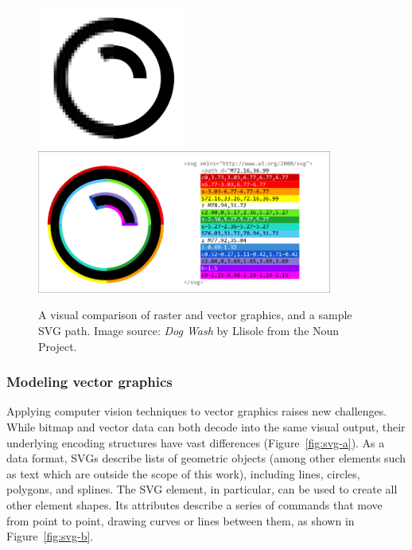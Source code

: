 \begin{figure}[t]
    {\includegraphics[height=1.85in]{figures/b_vs_vec}} \quad
    {\includegraphics[height=1.85in]{figures/svgs}}
    \caption[An overview of vector graphics and Scalable Vector Graphics (SVG)]
    {A visual comparison of raster and vector graphics, and a sample SVG path.
    Image source: \textit{Dog Wash} by Llisole from the Noun Project.\label{fig:svg}}
\end{figure}

\subsubsection{Modeling vector graphics}
Applying computer vision techniques to vector graphics raises new challenges.
While bitmap and vector data can both decode into the same visual output, their underlying encoding structures have vast differences (Figure~\ref{fig:svg-a}).
As a data format, SVGs describe lists of geometric objects (among other elements such as text which are outside the scope of this work), including lines, circles, polygons, and splines.
The SVG  element, in particular, can be used to create all other element shapes.
Its attributes describe a series of commands that move from point to point, drawing curves or lines between them, as shown in Figure~\ref{fig:svg-b}.

